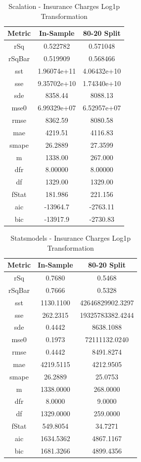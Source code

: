 \documentclass{article}
\begin{document}
\begin{table}[H]
\centering
\caption{Scalation - Insurance Charges Log1p Transformation}
\label{tab:Scalation - Insurance Charges Log1p Transformation}
\begin{tabular}{|c|c|c|} \hline 
Metric & In-Sample & 80-20 Split \\ \hline \hline 
rSq &0.522782 & 0.571048 \\ \hline 
rSqBar &0.519909 &      0.568466 \\ \hline 
sst &1.96074e+11 &      4.06432e+10 \\ \hline 
sse &9.35702e+10 &      1.74340e+10 \\ \hline 
sde &8358.44 &  8088.13 \\ \hline 
mse0 &6.99329e+07 &     6.52957e+07 \\ \hline 
rmse &8362.59 & 8080.58 \\ \hline 
mae &4219.51 &  4116.83 \\ \hline 
smape &26.2889 &        27.3599 \\ \hline 
m &1338.00 &    267.000 \\ \hline 
dfr &8.00000 &  8.00000 \\ \hline 
df &1329.00 &   1329.00 \\ \hline 
fStat &181.986 &        221.156 \\ \hline 
aic &-13964.7 & -2763.11 \\ \hline 
bic &-13917.9 & -2730.83 \\ \hline 
\end{tabular}
\end{table}

\begin{table}[H]
\centering
\caption{Statsmodels - Insurance Charges Log1p Transformation}
\label{tab:Statsmodels - Insurance Charges Log1p Transformation}
\begin{tabular}{|c|c|c|}\hline
Metric & In-Sample & 80-20 Split \\ \hline \hline
rSq & 0.7680 & 0.5468 \\ \hline
rSqBar & 0.7666 & 0.5328 \\ \hline
sst & 1130.1100 & 42646829902.3297 \\ \hline
sse & 262.2315 & 19325783382.4244 \\ \hline
sde & 0.4442 & 8638.1088 \\ \hline
mse0 & 0.1973 & 72111132.0240 \\ \hline
rmse & 0.4442 & 8491.8274 \\ \hline
mae & 4219.5115 & 4212.9505 \\ \hline
smape & 26.2889 & 25.0753 \\ \hline
m & 1338.0000 & 268.0000 \\ \hline
dfr & 8.0000 & 9.0000 \\ \hline
df & 1329.0000 & 259.0000 \\ \hline
fStat & 549.8054 & 34.7271 \\ \hline
aic & 1634.5362 & 4867.1167 \\ \hline
bic & 1681.3266 & 4899.4356 \\ \hline
\end{tabular}
\end{table}
\end{document}
